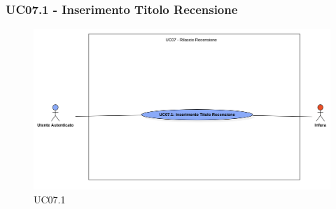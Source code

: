             \subsubsection{UC07.1 - Inserimento Titolo Recensione}
            \label{UC07.1}

                \begin{figure}[H]
                    \centering
                    \includegraphics[scale=0.4]{src/img/UC07.1.png}
                    \caption{UC07.1}
                \end{figure}

